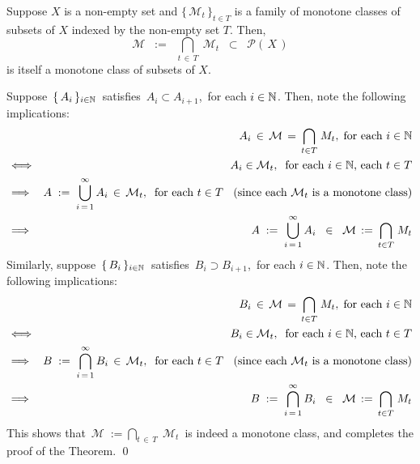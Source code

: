\begin{lemma}
\label{ArbitraryIntersectionOfMonotoneClassesIsMonotoneClass}
\mbox{}\vskip0.1cm\noindent
Suppose $X$ is a non-empty set and $\{\,\mathcal{M}_{t}\,\}_{t\in T}$
is a family of monotone classes of subsets of $X$ indexed by the non-empty set $T$.
Then, 
\begin{equation*}
\mathcal{M} \;\; := \;\; \underset{t\,\in\,T}{\bigcap}\;\mathcal{M}_{t} \;\; \subset \;\; \mathcal{P}\!\left(\,X\,\right)
\end{equation*}
is itself a monotone class of subsets of $X$.
\end{lemma}
\proof
Suppose \,$\{\,A_{i}\,\}_{i\in\mathbb{N}}$\, satisfies \,$A_{i}\subset A_{i+1}$,\, for each $i \in \mathbb{N}$.
Then, note the following implications:
\begin{eqnarray*}
&&
	A_{i} \,\in\, \mathcal{M}\,=\,\underset{t\in T}{\bigcap}\;M_{t},\;\textnormal{for each $i \in \mathbb{N}$}
\\
&\Longleftrightarrow&
	A_{i} \in \mathcal{M}_{t},\;\;\textnormal{for each $i \in \mathbb{N}$, each $t \in T$}
\\
&\Longrightarrow&
	A \;:=\; \overset{\infty}{\underset{i\,=\,1}{\bigcup}}\, A_{i} \,\in\, \mathcal{M}_{t},
	\;\;\textnormal{for each $t \in T$ \;\;(since each $\mathcal{M}_{t}$ is a monotone class)}
\\
&\Longrightarrow&
	A \;:=\; \overset{\infty}{\underset{i\,=\,1}{\bigcup}}\, A_{i} \;\;\in\;\; \mathcal{M}\,:=\,\underset{t\in T}{\bigcap}\;M_{t}
\end{eqnarray*}
Similarly, suppose \,$\{\,B_{i}\,\}_{i\in\mathbb{N}}$\, satisfies \,$B_{i}\supset B_{i+1}$,\, for each $i \in \mathbb{N}$.
Then, note the following implications:
\begin{eqnarray*}
&&
	B_{i} \,\in\, \mathcal{M}\,=\,\underset{t\in T}{\bigcap}\;M_{t},\;\textnormal{for each $i \in \mathbb{N}$}
\\
&\Longleftrightarrow&
	B_{i} \in \mathcal{M}_{t},\;\;\textnormal{for each $i \in \mathbb{N}$, each $t \in T$}
\\
&\Longrightarrow&
	B \;:=\; \overset{\infty}{\underset{i\,=\,1}{\bigcap}}\, B_{i} \,\in\, \mathcal{M}_{t},
	\;\;\textnormal{for each $t \in T$ \;\;(since each $\mathcal{M}_{t}$ is a monotone class)}
\\
&\Longrightarrow&
	B \;:=\; \overset{\infty}{\underset{i\,=\,1}{\bigcap}}\, B_{i} \;\;\in\;\; \mathcal{M}\,:=\,\underset{t\in T}{\bigcap}\;M_{t}
\end{eqnarray*}
This shows that \,$\mathcal{M} \; := \underset{t\,\in\,T}{\bigcap}\;\mathcal{M}_{t}$\,
is indeed a monotone class, and completes the proof of the Theorem.
\qed

